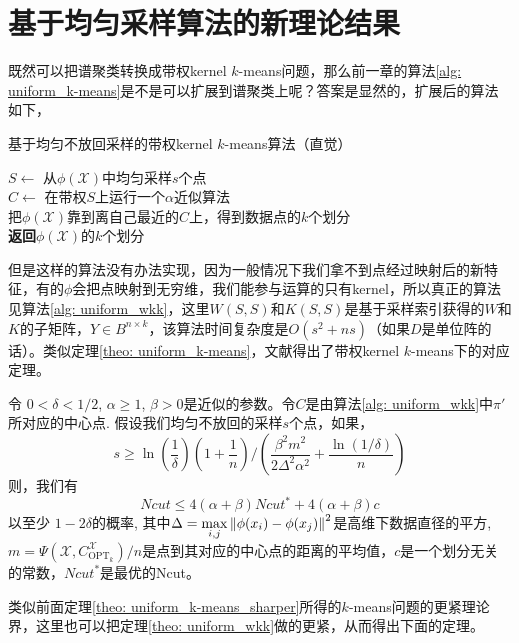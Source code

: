 \section{基于均匀采样算法的新理论结果}
既然可以把谱聚类转换成带权kernel $k$-means问题，那么前一章的算法\ref{alg: uniform_k-means}是不是可以扩展到谱聚类上呢？答案是显然的，扩展后的算法如下，
\begin{algorithm}
    \caption{基于均匀不放回采样的带权kernel $k$-means算法（直觉）}
    $S \gets$ 从$\phi(\mathcal{X})$中均匀采样$s$个点\\
    $C \gets$ 在带权$S$上运行一个$\alpha$近似算法\\
    把$\phi(\mathcal{X})$靠到离自己最近的$C$上，得到数据点的$k$个划分\\
    \textbf{返回}$\phi(\mathcal{X})$的$k$个划分
\end{algorithm}
但是这样的算法没有办法实现，因为一般情况下我们拿不到点经过映射后的新特征，有的$\phi$会把点映射到无穷维，我们能参与运算的只有kernel，所以真正的算法见算法\ref{alg: uniform_wkk}，这里$W(S,S)$和$K(S,S)$是基于采样索引获得的$W$和$K$的子矩阵，$Y\in B^{n\times k}$，该算法时间复杂度是$O(s^2+ns)$（如果$D$是单位阵的话）。类似定理\ref{theo: uniform_k-means}，文献\cite{Mohan:2017:BNA:3172077.3172235}得出了带权kernel $k$-means下的对应定理。
\begin{theorem}[均匀不放回采样的谱聚类解的质量]
    \label{theo: uniform_wkk}
    令 $0 < \delta <1/2$, $\alpha \geq 1$, $\beta >0$是近似的参数。令$C$是由算法\ref{alg: uniform_wkk}中$\pi'$所对应的中心点. 假设我们均匀不放回的采样$s$个点，如果，
    \begin{equation*}
    s \geq \ln(\frac{1}{\delta})(1+\frac{1}{n})/(\frac{\beta^2 m^2}{2\Delta^2 \alpha^2}+\frac{\ln(1/\delta)}{n})
    \end{equation*}
    则，我们有
    \begin{equation*}
    Ncut \leq 4(\alpha + \beta) Ncut^* + 4(\alpha + \beta)c
    \end{equation*}
    以至少 $1-2\delta$的概率, 其中$\Delta = \max\limits_{i,j}\left\lVert\phi(x_i) - \phi(x_j)\right\rVert^2$是高维下数据直径的平方, $m = \Psi(\mathcal{X},C_{\text{OPT}_k}^{\mathcal{X}})/n$是点到其对应的中心点的距离的平均值，$c$是一个划分无关的常数，$Ncut^*$是最优的Ncut。
\end{theorem}
类似前面定理\ref{theo: uniform_k-means_sharper}所得的$k$-means问题的更紧理论界，这里也可以把定理\ref{theo: uniform_wkk}做的更紧，从而得出下面的定理。
